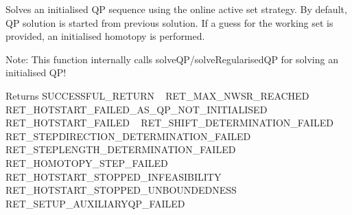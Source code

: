 Solves an initialised QP sequence using the online active set strategy. By default, QP solution is started from previous solution. If a guess for the working set is provided, an initialised homotopy is performed.

Note\+: This function internally calls solve\+Q\+P/solve\+Regularised\+QP for solving an initialised Q\+P!

\begin{DoxyReturn}{Returns}
S\+U\+C\+C\+E\+S\+S\+F\+U\+L\+\_\+\+R\+E\+T\+U\+RN ~\newline
 R\+E\+T\+\_\+\+M\+A\+X\+\_\+\+N\+W\+S\+R\+\_\+\+R\+E\+A\+C\+H\+ED ~\newline
 R\+E\+T\+\_\+\+H\+O\+T\+S\+T\+A\+R\+T\+\_\+\+F\+A\+I\+L\+E\+D\+\_\+\+A\+S\+\_\+\+Q\+P\+\_\+\+N\+O\+T\+\_\+\+I\+N\+I\+T\+I\+A\+L\+I\+S\+ED ~\newline
 R\+E\+T\+\_\+\+H\+O\+T\+S\+T\+A\+R\+T\+\_\+\+F\+A\+I\+L\+ED ~\newline
 R\+E\+T\+\_\+\+S\+H\+I\+F\+T\+\_\+\+D\+E\+T\+E\+R\+M\+I\+N\+A\+T\+I\+O\+N\+\_\+\+F\+A\+I\+L\+ED ~\newline
 R\+E\+T\+\_\+\+S\+T\+E\+P\+D\+I\+R\+E\+C\+T\+I\+O\+N\+\_\+\+D\+E\+T\+E\+R\+M\+I\+N\+A\+T\+I\+O\+N\+\_\+\+F\+A\+I\+L\+ED ~\newline
 R\+E\+T\+\_\+\+S\+T\+E\+P\+L\+E\+N\+G\+T\+H\+\_\+\+D\+E\+T\+E\+R\+M\+I\+N\+A\+T\+I\+O\+N\+\_\+\+F\+A\+I\+L\+ED ~\newline
 R\+E\+T\+\_\+\+H\+O\+M\+O\+T\+O\+P\+Y\+\_\+\+S\+T\+E\+P\+\_\+\+F\+A\+I\+L\+ED ~\newline
 R\+E\+T\+\_\+\+H\+O\+T\+S\+T\+A\+R\+T\+\_\+\+S\+T\+O\+P\+P\+E\+D\+\_\+\+I\+N\+F\+E\+A\+S\+I\+B\+I\+L\+I\+TY ~\newline
 R\+E\+T\+\_\+\+H\+O\+T\+S\+T\+A\+R\+T\+\_\+\+S\+T\+O\+P\+P\+E\+D\+\_\+\+U\+N\+B\+O\+U\+N\+D\+E\+D\+N\+E\+SS ~\newline
 R\+E\+T\+\_\+\+S\+E\+T\+U\+P\+\_\+\+A\+U\+X\+I\+L\+I\+A\+R\+Y\+Q\+P\+\_\+\+F\+A\+I\+L\+ED 
\end{DoxyReturn}


